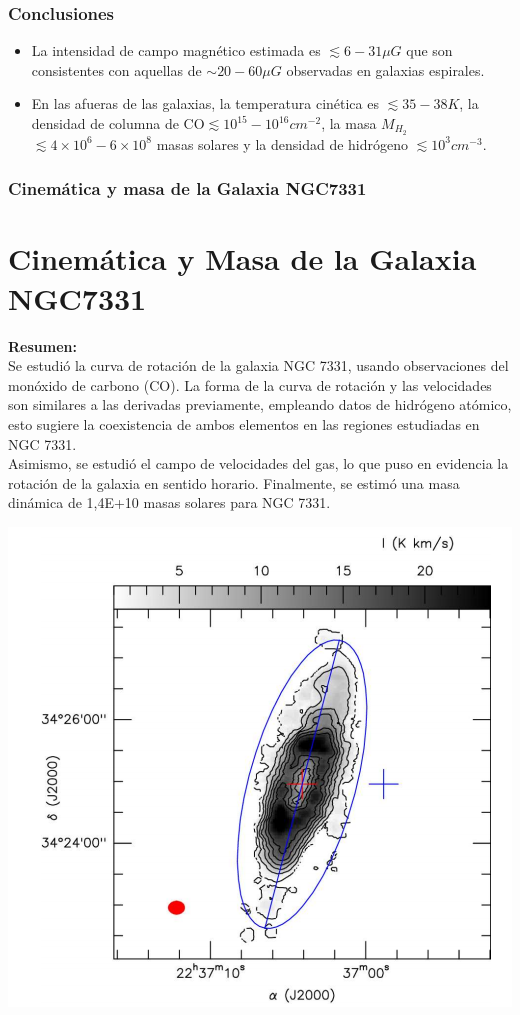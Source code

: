 \documentclass[8pt]{beamer}
\begin{document}
\begin{frame}
\frametitle{Conclusiones}
\begin{itemize}
    \item La intensidad de campo magnético estimada es $\lesssim 6-31\mu G$ que son consistentes con aquellas de  $\sim 20-60\mu G$ observadas en galaxias espirales.
    \item En las afueras de las galaxias, la temperatura cinética es $\lesssim 35-38K$, la densidad de columna  de CO$\lesssim 10^{15}-10^{16}cm^{-2}$, la masa $M_{H_2}$ $\lesssim4\times10^6-6\times 10^{8}$ masas solares y la densidad de hidrógeno $\lesssim10^3cm^{-3}$.  
\end{itemize}
\end{frame}
\begin{frame}
\frametitle{Cinemática y masa de la Galaxia NGC7331}
\section{Cinemática y Masa de la Galaxia NGC7331}
\textbf{Resumen:}\\
Se estudió la curva de rotación de la galaxia NGC 7331, usando observaciones del monóxido de carbono (CO). La forma de la curva de rotación y las velocidades son similares a las derivadas previamente, empleando datos de hidrógeno atómico, esto sugiere la coexistencia de ambos elementos en las regiones estudiadas en NGC 7331. \\
Asimismo, se estudió el campo de velocidades del gas, lo que puso en evidencia la rotación de la galaxia en sentido horario. Finalmente, se estimó una masa dinámica de 1,4E+10 masas solares para NGC 7331. 
\begin{center}
\includegraphics[width=0.4\linewidth]{figures/ngc7331_1.png}
\end{center}
\end{frame}
\end{document}
